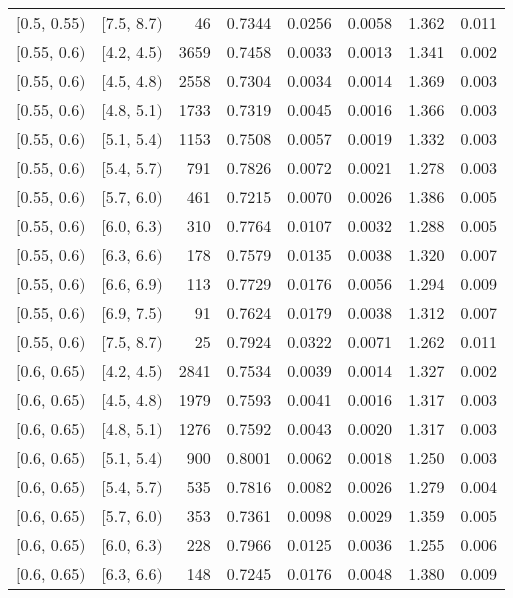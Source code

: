 \begin{longtable}{| l | l | r | r | r | r | r | r |}
        $[$0.5, 0.55$)$ & $[$7.5, 8.7$)$ & 46 & 0.7344 & 0.0256 & 0.0058 & 1.362 & 0.011 \\
        $[$0.55, 0.6$)$ & $[$4.2, 4.5$)$ & 3659 & 0.7458 & 0.0033 & 0.0013 & 1.341 & 0.002 \\
        $[$0.55, 0.6$)$ & $[$4.5, 4.8$)$ & 2558 & 0.7304 & 0.0034 & 0.0014 & 1.369 & 0.003 \\
        $[$0.55, 0.6$)$ & $[$4.8, 5.1$)$ & 1733 & 0.7319 & 0.0045 & 0.0016 & 1.366 & 0.003 \\
        $[$0.55, 0.6$)$ & $[$5.1, 5.4$)$ & 1153 & 0.7508 & 0.0057 & 0.0019 & 1.332 & 0.003 \\
        $[$0.55, 0.6$)$ & $[$5.4, 5.7$)$ & 791 & 0.7826 & 0.0072 & 0.0021 & 1.278 & 0.003 \\
        $[$0.55, 0.6$)$ & $[$5.7, 6.0$)$ & 461 & 0.7215 & 0.0070 & 0.0026 & 1.386 & 0.005 \\
        $[$0.55, 0.6$)$ & $[$6.0, 6.3$)$ & 310 & 0.7764 & 0.0107 & 0.0032 & 1.288 & 0.005 \\
        $[$0.55, 0.6$)$ & $[$6.3, 6.6$)$ & 178 & 0.7579 & 0.0135 & 0.0038 & 1.320 & 0.007 \\
        $[$0.55, 0.6$)$ & $[$6.6, 6.9$)$ & 113 & 0.7729 & 0.0176 & 0.0056 & 1.294 & 0.009 \\
        $[$0.55, 0.6$)$ & $[$6.9, 7.5$)$ & 91 & 0.7624 & 0.0179 & 0.0038 & 1.312 & 0.007 \\
        $[$0.55, 0.6$)$ & $[$7.5, 8.7$)$ & 25 & 0.7924 & 0.0322 & 0.0071 & 1.262 & 0.011 \\
        $[$0.6, 0.65$)$ & $[$4.2, 4.5$)$ & 2841 & 0.7534 & 0.0039 & 0.0014 & 1.327 & 0.002 \\
        $[$0.6, 0.65$)$ & $[$4.5, 4.8$)$ & 1979 & 0.7593 & 0.0041 & 0.0016 & 1.317 & 0.003 \\
        $[$0.6, 0.65$)$ & $[$4.8, 5.1$)$ & 1276 & 0.7592 & 0.0043 & 0.0020 & 1.317 & 0.003 \\
        $[$0.6, 0.65$)$ & $[$5.1, 5.4$)$ & 900 & 0.8001 & 0.0062 & 0.0018 & 1.250 & 0.003 \\
        $[$0.6, 0.65$)$ & $[$5.4, 5.7$)$ & 535 & 0.7816 & 0.0082 & 0.0026 & 1.279 & 0.004 \\
        $[$0.6, 0.65$)$ & $[$5.7, 6.0$)$ & 353 & 0.7361 & 0.0098 & 0.0029 & 1.359 & 0.005 \\
        $[$0.6, 0.65$)$ & $[$6.0, 6.3$)$ & 228 & 0.7966 & 0.0125 & 0.0036 & 1.255 & 0.006 \\
        $[$0.6, 0.65$)$ & $[$6.3, 6.6$)$ & 148 & 0.7245 & 0.0176 & 0.0048 & 1.380 & 0.009 \\

\end{longtable}
